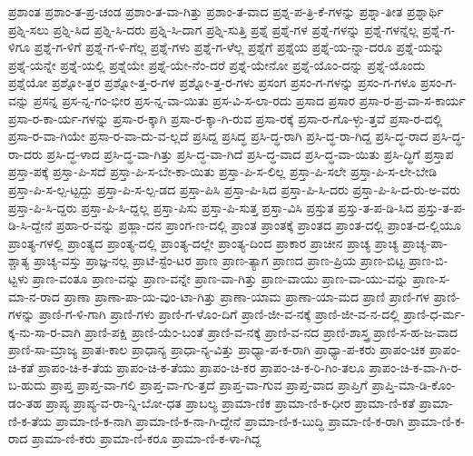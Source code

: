 {ಪ್ರಶಾಂತ
ಪ್ರಶಾಂ-ತ-ಪ್ರ-ಚಂಡ
ಪ್ರಶಾಂ-ತ-ವಾ-ಗಿತ್ತು
ಪ್ರಶಾಂ-ತ-ವಾದ
ಪ್ರಶ್ನ-ಪ-ತ್ರಿ-ಕೆ-ಗಳನ್ನು
ಪ್ರಶ್ನಾ-ತೀತ
ಪ್ರಶ್ನಾರ್ಥಿ
ಪ್ರಶ್ನಿ-ಸಲು
ಪ್ರಶ್ನಿ-ಸಿದ
ಪ್ರಶ್ನಿ-ಸಿ-ದರು
ಪ್ರಶ್ನಿ-ಸಿ-ದಾಗ
ಪ್ರಶ್ನಿ-ಸುತ್ತಿ
ಪ್ರಶ್ನೆ
ಪ್ರಶ್ನೆ-ಗಳ
ಪ್ರಶ್ನೆ-ಗಳನ್ನು
ಪ್ರಶ್ನೆ-ಗಳನ್ನೆಲ್ಲ
ಪ್ರಶ್ನೆ-ಗ-ಳಿಗೂ
ಪ್ರಶ್ನೆ-ಗ-ಳಿಗೆ
ಪ್ರಶ್ನೆ-ಗ-ಳಿ-ಗೆಲ್ಲ
ಪ್ರಶ್ನೆ-ಗಳು
ಪ್ರಶ್ನೆ-ಗ-ಳೆಲ್ಲ
ಪ್ರಶ್ನೆಗೆ
ಪ್ರಶ್ನೆಯ
ಪ್ರಶ್ನೆ-ಯ-ನ್ನಾ-ದರೂ
ಪ್ರಶ್ನೆ-ಯನ್ನು
ಪ್ರಶ್ನೆ-ಯನ್ನೇ
ಪ್ರಶ್ನೆ-ಯಲ್ಲಿ
ಪ್ರಶ್ನೆಯೇ
ಪ್ರಶ್ನೆ-ಯೇ-ನೆಂ-ದರೆ
ಪ್ರಶ್ನೆ-ಯೇನೋ
ಪ್ರಶ್ನೆ-ಯೊಂ-ದನ್ನು
ಪ್ರಶ್ನೆ-ಯೊಂದು
ಪ್ರಶ್ನೆಯೋ
ಪ್ರಶ್ನೋ-ತ್ತರ
ಪ್ರಶ್ನೋ-ತ್ತ-ರ-ಗಳ
ಪ್ರಶ್ನೋ-ತ್ತ-ರ-ಗಳು
ಪ್ರಸಂಗ
ಪ್ರಸಂ-ಗ-ಗಳನ್ನು
ಪ್ರಸಂ-ಗ-ಗಳೂ
ಪ್ರಸಂ-ಗ-ವನ್ನು
ಪ್ರಸನ್ನ
ಪ್ರಸ-ನ್ನ-ಗಂ-ಭೀರ
ಪ್ರಸ-ನ್ನ-ವಾ-ಯಿತು
ಪ್ರಸ-ವಿ-ಸ-ಲಾ-ರದು
ಪ್ರಸಾದ
ಪ್ರಸಾರ
ಪ್ರಸಾ-ರ-ಪ್ರ-ವಾ-ಸ-ಕಾರ್ಯ
ಪ್ರಸಾ-ರ-ಕಾ-ರ್ಯ-ಗಳನ್ನು
ಪ್ರಸಾ-ರ-ಕ್ಕಾಗಿ
ಪ್ರಸಾ-ರ-ಕ್ಕಾ-ಗಿ-ರುವ
ಪ್ರಸಾ-ರಕ್ಕೆ
ಪ್ರಸಾ-ರ-ಗೊ-ಳ್ಳು-ತ್ತವೆ
ಪ್ರಸಾ-ರ-ದಲ್ಲಿ
ಪ್ರಸಾ-ರ-ವಾ-ಗಿಯೇ
ಪ್ರಸಾ-ರ-ವಾ-ದು-ವ-ಲ್ಲದೆ
ಪ್ರಸಿದ್ದ
ಪ್ರಸಿದ್ಧ
ಪ್ರಸಿ-ದ್ಧ-ರಾಗಿ
ಪ್ರಸಿ-ದ್ಧ-ರಾ-ಗಿದ್ದ
ಪ್ರಸಿ-ದ್ಧ-ರಾದ
ಪ್ರಸಿ-ದ್ಧ-ರಾ-ದರು
ಪ್ರಸಿ-ದ್ಧ-ಳಾದ
ಪ್ರಸಿ-ದ್ಧ-ವಾ-ಗಿತ್ತು
ಪ್ರಸಿ-ದ್ಧ-ವಾ-ಗಿದೆ
ಪ್ರಸಿ-ದ್ಧ-ವಾದ
ಪ್ರಸಿ-ದ್ಧ-ವಾ-ಯಿತು
ಪ್ರಸಿ-ದ್ಧಿಗೆ
ಪ್ರಸ್ತಾಪ
ಪ್ರಸ್ತಾ-ಪಕ್ಕೆ
ಪ್ರಸ್ತಾ-ಪಿ-ಸದೆ
ಪ್ರಸ್ತಾ-ಪಿ-ಸ-ಬೇ-ಕಾ-ಯಿತು
ಪ್ರಸ್ತಾ-ಪಿ-ಸ-ಲಿಲ್ಲ
ಪ್ರಸ್ತಾ-ಪಿ-ಸಲೇ
ಪ್ರಸ್ತಾ-ಪಿ-ಸ-ಲೇ-ಬೇಡಿ
ಪ್ರಸ್ತಾ-ಪಿ-ಸ-ಲ್ಪ-ಟ್ಟದ್ದು
ಪ್ರಸ್ತಾ-ಪಿ-ಸ-ಲ್ಪ-ಡದ
ಪ್ರಸ್ತಾ-ಪಿಸಿ
ಪ್ರಸ್ತಾ-ಪಿ-ಸಿದ
ಪ್ರಸ್ತಾ-ಪಿ-ಸಿ-ದರು
ಪ್ರಸ್ತಾ-ಪಿ-ಸಿ-ದ-ರು-ಅ-ವರು
ಪ್ರಸ್ತಾ-ಪಿ-ಸಿ-ದ್ದರು
ಪ್ರಸ್ತಾ-ಪಿ-ಸಿ-ದ್ದಲ್ಲ
ಪ್ರಸ್ತಾ-ಪಿಸು
ಪ್ರಸ್ತಾ-ಪಿ-ಸುತ್ತ
ಪ್ರಸ್ತಾ-ವಿಸಿ
ಪ್ರಸ್ತುತ
ಪ್ರಸ್ತು-ತ-ಪ-ಡಿ-ಸಿದ
ಪ್ರಸ್ತು-ತ-ಪ-ಡಿ-ಸಿ-ದ್ದೇನೆ
ಪ್ರಹಾ-ರ-ವನ್ನು
ಪ್ರಹ್ಲಾ-ದನ
ಪ್ರಾಂಗ-ಣ-ದಲ್ಲಿ
ಪ್ರಾಂತ
ಪ್ರಾಂತಕ್ಕೆ
ಪ್ರಾಂತದ
ಪ್ರಾಂತ-ದಲ್ಲಿ
ಪ್ರಾಂತ-ದ-ಲ್ಲಿಯೂ
ಪ್ರಾಂತ್ಯ-ಗಳಲ್ಲಿ
ಪ್ರಾಂತ್ಯದ
ಪ್ರಾಂತ್ಯ-ದಲ್ಲಿ
ಪ್ರಾಂತ್ಯ-ದಲ್ಲೇ
ಪ್ರಾಂತ್ಯ-ದಿಂದ
ಪ್ರಾಕಾರ
ಪ್ರಾಚೀನ
ಪ್ರಾಚ್ಯ
ಪ್ರಾಚ್ಯ
ಪ್ರಾಚ್ಯ-ಪಾ-ಶ್ಚಾತ್ಯ
ಪ್ರಾಚ್ಯ-ವಸ್ತು
ಪ್ರಾಜ್ಞ-ನಲ್ಲ
ಪ್ರಾಟೆ-ಸ್ಟೆಂ-ಟರ
ಪ್ರಾಣ
ಪ್ರಾಣ-ತ್ಯಾಗ
ಪ್ರಾಣದ
ಪ್ರಾಣ-ಪ್ರಿಯ
ಪ್ರಾಣ-ಬಿಟ್ಟ
ಪ್ರಾಣ-ಬಿ-ಟ್ಟಳು
ಪ್ರಾಣ-ವಂತೂ
ಪ್ರಾಣ-ವನ್ನು
ಪ್ರಾಣ-ವನ್ನೇ
ಪ್ರಾಣ-ವಾ-ಗಿತ್ತು
ಪ್ರಾಣ-ವಾಯು
ಪ್ರಾಣ-ವಾ-ಯು-ವನ್ನು
ಪ್ರಾಣ-ಸ-ಮಾ-ನ-ರಾದ
ಪ್ರಾಣಾ
ಪ್ರಾಣಾ-ಪಾ-ಯ-ವುಂ-ಟಾ-ಗಿತ್ತು
ಪ್ರಾಣಾ-ಯಾಮ
ಪ್ರಾಣಾ-ಯಾ-ಮದ
ಪ್ರಾಣಿ
ಪ್ರಾಣಿ-ಗಳ
ಪ್ರಾಣಿ-ಗಳನ್ನು
ಪ್ರಾಣಿ-ಗ-ಳಿ-ಗಾಗಿ
ಪ್ರಾಣಿ-ಗಳು
ಪ್ರಾಣಿ-ಗ-ಳೊಂ-ದಿಗೆ
ಪ್ರಾಣಿ-ಜೀ-ವ-ನಕ್ಕೆ
ಪ್ರಾಣಿ-ಜೀ-ವ-ನ-ದಲ್ಲಿ
ಪ್ರಾಣಿ-ಧ-ರ್ಮ-ಕ್ಕ-ನು-ಸಾ-ರ-ವಾಗಿ
ಪ್ರಾಣಿ-ಪಕ್ಷಿ
ಪ್ರಾಣಿ-ಯೆಂ-ಬಂತೆ
ಪ್ರಾಣಿ-ವ-ನಕ್ಕೆ
ಪ್ರಾಣಿ-ವ-ನದ
ಪ್ರಾಣಿ-ಶಾಸ್ತ್ರ
ಪ್ರಾಣಿ-ಸ-ಹ-ಜ-ವಾದ
ಪ್ರಾಣಿ-ಸಾ-ಮ್ರಾಜ್ಯ
ಪ್ರಾತಃ-ಕಾಲ
ಪ್ರಾಧಾನ್ಯ
ಪ್ರಾಧಾ-ನ್ಯ-ವಿತ್ತು
ಪ್ರಾಧ್ಯಾ-ಪ-ಕ-ರಾಗಿ
ಪ್ರಾಧ್ಯಾ-ಪ-ಕರು
ಪ್ರಾಪಂ-ಚಿಕ
ಪ್ರಾಪಂ-ಚಿ-ಕತೆ
ಪ್ರಾಪಂ-ಚಿ-ಕ-ತೆಯ
ಪ್ರಾಪಂ-ಚಿ-ಕ-ತೆಯು
ಪ್ರಾಪಂ-ಚಿ-ಕರ
ಪ್ರಾಪಂ-ಚಿ-ಕ-ರಿ-ಗಿಂ-ತಲೂ
ಪ್ರಾಪಂ-ಚಿ-ಕ-ವಾ-ಗಿ-ರ-ಬ-ಹುದು
ಪ್ರಾಪ್ತ
ಪ್ರಾಪ್ತ-ವಾ-ಗಲಿ
ಪ್ರಾಪ್ತ-ವಾ-ಗು-ತ್ತದೆ
ಪ್ರಾಪ್ತ-ವಾ-ಗುವ
ಪ್ರಾಪ್ತ-ವಾದ
ಪ್ರಾಪ್ತಿಗೆ
ಪ್ರಾಪ್ತಿ-ಮಾ-ಡಿ-ಕೊಂ-ಡಂ-ತಹ
ಪ್ರಾಪ್ಯ
ಪ್ರಾಪ್ಯ-ವ-ರಾ-ನ್ನಿ-ಬೋ-ಧತ
ಪ್ರಾಬಲ್ಯ
ಪ್ರಾಮಾ-ಣಿಕ
ಪ್ರಾಮಾ-ಣಿ-ಕ-ಧೀರ
ಪ್ರಾಮಾ-ಣಿ-ಕತೆ
ಪ್ರಾಮಾ-ಣಿ-ಕ-ತೆಯ
ಪ್ರಾಮಾ-ಣಿ-ಕ-ನಾಗಿ
ಪ್ರಾಮಾ-ಣಿ-ಕ-ನಾ-ಗಿ-ದ್ದೇನೆ
ಪ್ರಾಮಾ-ಣಿ-ಕ-ಬುದ್ಧಿ
ಪ್ರಾಮಾ-ಣಿ-ಕ-ರಾಗಿ
ಪ್ರಾಮಾ-ಣಿ-ಕ-ರಾದ
ಪ್ರಾಮಾ-ಣಿ-ಕರು
ಪ್ರಾಮಾ-ಣಿ-ಕರೂ
ಪ್ರಾಮಾ-ಣಿ-ಕ-ಳಾ-ಗಿದ್ದ
}
